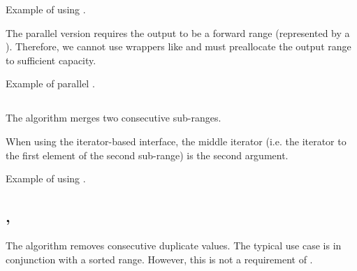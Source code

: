 \begin{box-note}
\footnotesize Example of using .
\tcblower
{}
\end{box-note}

The parallel version requires the output to be a forward range (represented by a ). Therefore, we cannot use wrappers like  and must preallocate the output range to sufficient capacity.

\begin{box-note}
\footnotesize Example of parallel .
\tcblower
{}
\end{box-note}

\subsection{\texorpdfstring{}{\texttt{std::inplace\_merge}}}

The  algorithm merges two consecutive sub-ranges.


When using the iterator-based interface, the middle iterator (i.e. the iterator to the first element of the second sub-range) is the second argument.

\begin{box-note}
\footnotesize Example of using .
\tcblower
{}
\end{box-note}

\subsection{\texorpdfstring{, }{\texttt{std::unique}, \texttt{std::unique\_copy}}}

The  algorithm removes consecutive duplicate values. The typical use case is in conjunction with a sorted range. However, this is not a requirement of .


